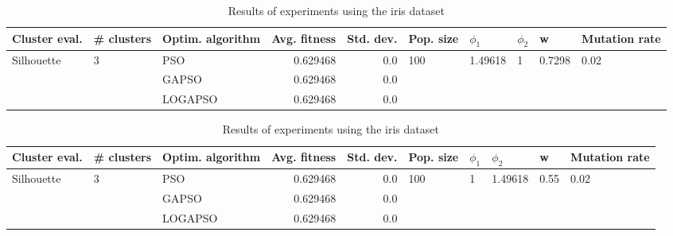 \documentclass{article}
\begin{document}
\begin{table}
\centering
\caption{Results of experiments using the iris dataset}
\begin{tabular}{lllrrlllll}
\toprule
              Cluster eval. &        \# clusters & Optim. algorithm &  Avg. fitness &  Std. dev. &            Pop. size &               $\phi_{1}$ &         $\phi_{2}$ &                       w &         Mutation rate \\
\midrule
\multirow{3}{*}{Silhouette} & \multirow{3}{*}{3} &              PSO &      0.629468 &        0.0 & \multirow{3}{*}{100} & \multirow{3}{*}{1.49618} & \multirow{3}{*}{1} & \multirow{3}{*}{0.7298} & \multirow{3}{*}{0.02} \\
                            &                    &            GAPSO &      0.629468 &        0.0 &                      &                          &                    &                         &                       \\
                            &                    &          LOGAPSO &      0.629468 &        0.0 &                      &                          &                    &                         &                       \\
\bottomrule
\end{tabular}
\end{table}
\begin{table}
\centering
\caption{Results of experiments using the iris dataset}
\begin{tabular}{lllrrlllll}
\toprule
              Cluster eval. &        \# clusters & Optim. algorithm &  Avg. fitness &  Std. dev. &            Pop. size &         $\phi_{1}$ &               $\phi_{2}$ &                     w &         Mutation rate \\
\midrule
\multirow{3}{*}{Silhouette} & \multirow{3}{*}{3} &              PSO &      0.629468 &        0.0 & \multirow{3}{*}{100} & \multirow{3}{*}{1} & \multirow{3}{*}{1.49618} & \multirow{3}{*}{0.55} & \multirow{3}{*}{0.02} \\
                            &                    &            GAPSO &      0.629468 &        0.0 &                      &                    &                          &                       &                       \\
                            &                    &          LOGAPSO &      0.629468 &        0.0 &                      &                    &                          &                       &                       \\
\bottomrule
\end{tabular}
\end{table}
\end{document}
